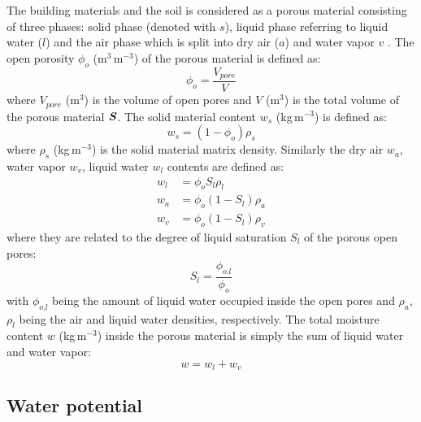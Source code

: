 The building materials and the soil is considered as a porous material consisting of three phases: solid phase (denoted with $s$), liquid phase referring to liquid water ($l$) and the air phase which is split into dry air ($a$) and water vapor $v$ \citep{Defraeye2011, Saneinejad2013, Carmaliet2005,Janssen2002}. The open porosity $\phi_o$ (m$^3$\,m$^{-3}$) of the porous material is defined as:
\begin{equation}
\phi_o = \frac{V_{\mathit{pore}}}{V}
\end{equation}
where $V_{\textit{pore}}$ (m$^3$) is the volume of open pores and $V$ (m$^3$) is the total volume of the porous material $\textbf{\textit{S}}$. The solid material content $w_s$ (kg\,m$^{-3}$) is defined as:
\begin{equation}
w_s = \left(1 - \phi_o \right) \rho_s
\end{equation}
where $\rho_s$ (kg\,m$^{-3}$) is the solid material matrix density. Similarly the dry air $w_a$, water vapor $w_v$, liquid water $w_l$ contents are defined as:
\begin{align}
w_l &= \phi_o S_l \rho_l \\
w_a &= \phi_o \left( 1 - S_l \right) \rho_a \\
w_v &= \phi_o \left( 1 - S_l \right) \rho_v
\end{align}
where they are related to the degree of liquid saturation $S_l$ of the porous open pores:
\begin{equation}
S_l = \frac{\phi_{\textit{o,l}}}{\phi_o}
\end{equation}
with $\phi_{\textit{o,l}}$ being the amount of liquid water occupied inside the open pores and $\rho_a$, $\rho_l$ being the air and liquid water densities, respectively. The total moisture content $w$ (kg\,m$^{-3}$) inside the porous material is simply the sum of liquid water and water vapor:
\begin{equation}
w = w_l + w_v
\end{equation}

\subsection{Water potential}

